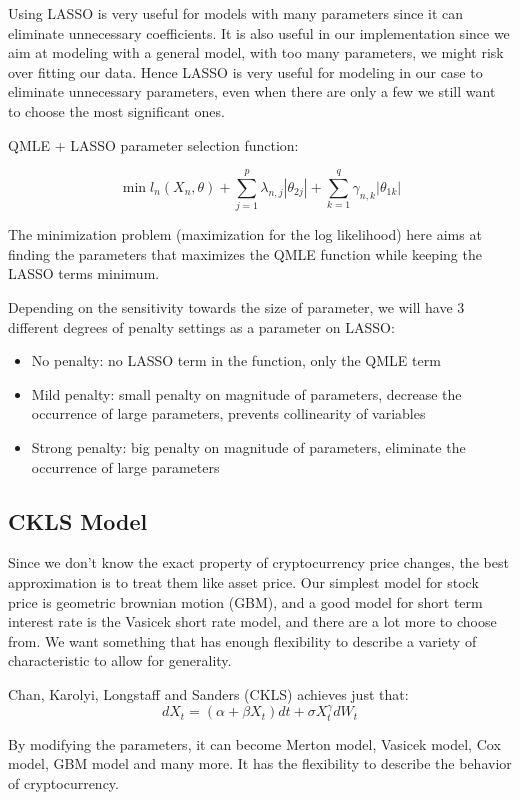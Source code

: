 \begin{spacing}{1.5}
Using LASSO is very useful for models with many parameters since it can eliminate unnecessary coefficients. It is also useful in our implementation since we aim at modeling with a general model, with too many parameters, we might risk over fitting our data. Hence LASSO is very useful for modeling in our case to eliminate unnecessary parameters, even when there are only a few we still want to choose the most significant ones.

QMLE + LASSO parameter selection function:

$$
\min l_n(X_n,\theta)+ \sum^p_{j=1}\lambda_{n,j} |\theta_{2j}| + \sum^q_{k = 1}\gamma_{n,k} |\theta_{1k}|
$$

The minimization problem (maximization for the log likelihood) here aims at finding the parameters that maximizes the QMLE function while keeping the LASSO terms minimum. 

Depending on the sensitivity towards the size of parameter, we will have 3 different degrees of penalty settings as a parameter on LASSO:
\begin{itemize}
\item No penalty: no LASSO term in the function, only the QMLE term
\item Mild penalty: small penalty on magnitude of parameters, decrease the occurrence of large parameters, prevents collinearity of variables
\item Strong penalty: big penalty on magnitude of parameters, eliminate the occurrence of large parameters
\end{itemize}

\subsection{CKLS Model}
Since we don't know the exact property of cryptocurrency price changes, the best approximation is to treat them like asset price. Our simplest model for stock price is geometric brownian motion (GBM), and a good model for short term interest rate is the Vasicek short rate model, and there are a lot more to choose from. We want something that has enough flexibility to describe a variety of characteristic to allow for generality.

Chan, Karolyi, Longstaff and Sanders (CKLS) achieves just that:
$$
dX_t = (\alpha + \beta X_t)dt + \sigma X_t^{\gamma}dW_t
$$

By modifying the parameters, it can become Merton model, Vasicek model, Cox model, GBM model and many more. It has the flexibility to describe the behavior of cryptocurrency.


\end{spacing}
